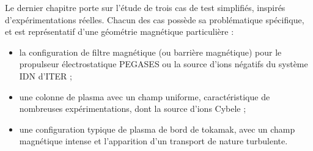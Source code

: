 \begin{refsection}
	 Le dernier chapitre porte sur l'étude de trois cas de test simplifiés,
inspirés d'expérimentations réelles. Chacun des cas possède sa problématique
spécifique, et est représentatif d'une géométrie magnétique
particulière :
\begin{itemize}
  \item la configuration de filtre magnétique (ou barrière magnétique) pour le
  propulseur électrostatique PEGASES ou la source d'ions négatifs du système IDN d'ITER ;
		\item une colonne de plasma avec un champ uniforme, caractéristique de
		nombreuses expérimentations, dont la source d'ions Cybele ;
		\item une configuration typique de plasma de bord de tokamak, avec un champ
		magnétique intense et l'apparition d'un transport de nature turbulente.
\end{itemize}


%
%
\end{refsection}
\renewcommand{\thefigure}{\thesection.\arabic{figure}}
\renewcommand{\theequation}{\thechapter-\thesection.\arabic{equation}}

